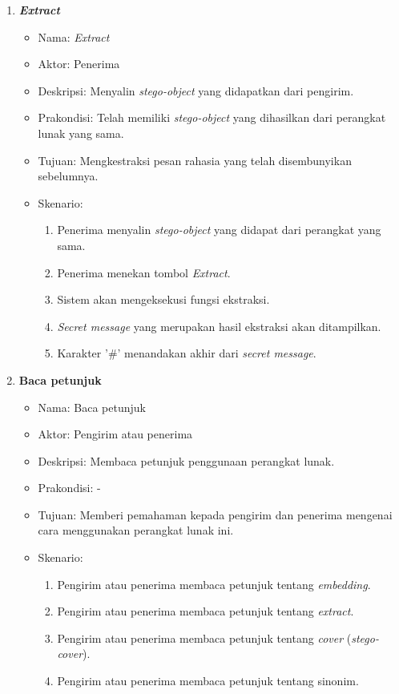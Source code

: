 \begin{enumerate}
	\item \textbf{\textit{Extract}}
	\begin{itemize}
		\item Nama: \textit{Extract}
		\item Aktor: Penerima
		\item Deskripsi: Menyalin \textit{stego-object} yang didapatkan dari pengirim.
		\item Prakondisi: Telah memiliki \textit{stego-object} yang dihasilkan dari perangkat lunak yang sama.
		\item Tujuan: Mengkestraksi pesan rahasia yang telah disembunyikan sebelumnya.
		\item Skenario:
			\begin{enumerate}
				\item Penerima menyalin \textit{stego-object} yang didapat dari perangkat yang sama.
				\item Penerima menekan tombol \textit{Extract}.
				\item Sistem akan mengeksekusi fungsi ekstraksi.
				\item \textit{Secret message} yang merupakan hasil ekstraksi akan ditampilkan.
				\item Karakter '$\#$' menandakan akhir dari \textit{secret message}.
			\end{enumerate}
	\end{itemize}
	
	\item \textbf{Baca petunjuk}
	\begin{itemize}
		\item Nama: Baca petunjuk
		\item Aktor: Pengirim atau penerima
		\item Deskripsi: Membaca petunjuk penggunaan perangkat lunak.
		\item Prakondisi: -
		\item Tujuan: Memberi pemahaman kepada pengirim dan penerima mengenai cara menggunakan perangkat lunak ini.
		\item Skenario:
			\begin{enumerate}
				\item Pengirim atau penerima membaca petunjuk tentang \textit{embedding}.
				\item Pengirim atau penerima membaca petunjuk tentang \textit{extract}.
				\item Pengirim atau penerima membaca petunjuk tentang \textit{cover} (\textit{stego-cover}).
				\item Pengirim atau penerima membaca petunjuk tentang sinonim.
			\end{enumerate}
	\end{itemize}
\end{enumerate}

